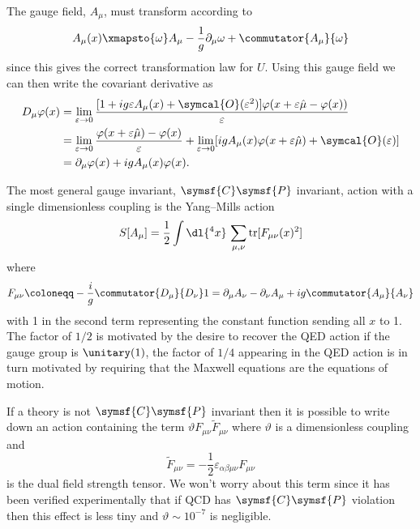 \documentclass[fleqn]{NotesClass}
\newcommand{\covariantDerivative}{D}
\newcommand{\order}{\symcal{O}}
\DeclareMathOperator{\tr}{tr}
\newcommand{\chargeConjugation}{\symsf{C}}
\newcommand{\parity}{\symsf{P}}
\begin{document}
    The gauge field, \(A_\mu\), must transform according to
    \begin{equation}
        A_\mu(x) \xmapsto{\omega} A_\mu - \frac{1}{g}\partial_\mu \omega + \commutator{A_\mu}{\omega}
    \end{equation}
    since this gives the correct transformation law for \(U\).
    Using this gauge field we can then write the covariant derivative as
    \begin{align}
        \covariantDerivative_\mu \varphi(x)& = \lim_{\varepsilon\to0} \frac{[1 + ig\varepsilon A_\mu(x) + \order(\varepsilon^2)]\varphi(x + \varepsilon\hat{\mu} - \varphi(x))}{\varepsilon}\\
        &= \lim_{\varepsilon\to0} \frac{\varphi(x + \varepsilon\hat{\mu}) - \varphi(x)}{\varepsilon} + \lim_{\varepsilon\to0} [igA_\mu(x)\varphi(x + \varepsilon\hat{\mu}) + \order(\varepsilon)]\\
        &= \partial_\mu \varphi(x) + igA_\mu(x)\varphi(x).
    \end{align}
    
    The most general gauge invariant, \(\chargeConjugation\parity\) invariant, action with a single dimensionless coupling is the Yang--Mills action
    \begin{equation}
        S[A_\mu] = \frac{1}{2} \int \dl{^4x} \, \sum_{\mu, \nu} \tr[F_{\mu\nu}(x)^2]
    \end{equation}
    where
    \begin{equation}
        F_{\mu\nu} \coloneqq -\frac{i}{g}\commutator{\covariantDerivative_\mu}{\covariantDerivative_\nu}1 = \partial_\mu A_\nu - \partial_\nu A_\mu + ig \commutator{A_\mu}{A_\nu}
    \end{equation}
    with 1 in the second term representing the constant function sending all \(x\) to 1.
    The factor of \(1/2\) is motivated by the desire to recover the QED action if the gauge group is \(\unitary(1)\), the factor of \(1/4\) appearing in the QED action is in turn motivated by requiring that the Maxwell equations are the equations of motion.
    
    If a theory is not \(\chargeConjugation\parity\) invariant then it is possible to write down an action containing the term \(\vartheta F_{\mu\nu}\tilde{F}_{\mu\nu}\) where \(\vartheta\) is a dimensionless coupling and
    \begin{equation}
        \tilde{F}_{\mu\nu} = -\frac{1}{2}\varepsilon_{\alpha\beta\mu\nu}F_{\mu\nu}
    \end{equation}
    is the dual field strength tensor.
    We won't worry about this term since it has been verified experimentally that if QCD has \(\chargeConjugation\parity\) violation then this effect is less tiny and \(\vartheta \sim 10^{-7}\) is negligible.
    
\end{document}
